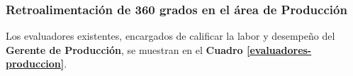 \begin{table}[h]
    \centering
    \caption{Tabla de evaluación de retroalimentación de 360 grados.}
    \label{evaluacion-retroalimentacion}
\end{table}


\subsubsection{Retroalimentación de 360 grados en el área de Producción}

Los evaluadores existentes, encargados de calificar la labor y desempeño del \textbf{Gerente de Producción}, se muestran en el \textbf{Cuadro \ref{evaluadores-produccion}}.


